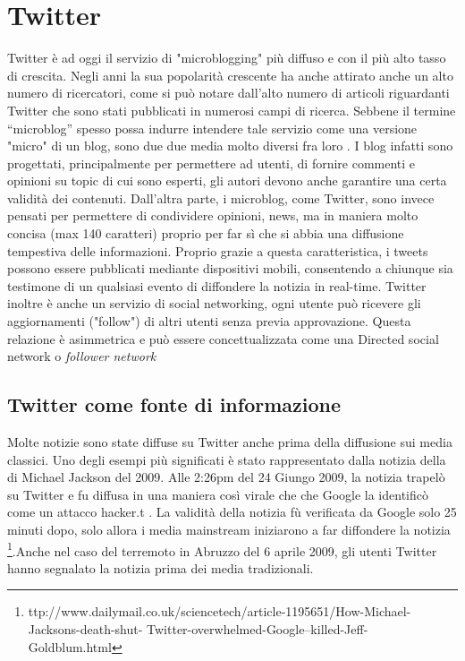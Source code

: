 \section*{Twitter}
Twitter è ad oggi il servizio di "microblogging" più diffuso e con il più alto tasso di crescita.  Negli anni la sua popolarità crescente ha anche attirato anche un alto numero di ricercatori, come si può notare dall'alto numero di articoli riguardanti Twitter che sono stati pubblicati in numerosi campi di ricerca.
Sebbene il termine  “microblog” spesso possa indurre intendere tale servizio come una versione "micro" di un blog, sono due due media molto diversi fra loro \cite{export:69500}. I blog infatti sono progettati, principalmente per permettere ad utenti, di fornire commenti e opinioni su topic di cui sono esperti, gli autori devono anche garantire una certa validità dei contenuti. Dall'altra parte, i microblog, come Twitter, sono invece pensati per permettere di condividere opinioni, news, ma in maniera molto concisa (max 140 caratteri) proprio per far sì che si abbia una  diffusione tempestiva delle informazioni. Proprio grazie a questa caratteristica, i tweets possono essere pubblicati mediante dispositivi mobili, consentendo a chiunque sia testimone di un qualsiasi evento di diffondere la notizia in real-time. Twitter inoltre è anche un servizio di social networking, ogni utente può ricevere gli aggiornamenti ("follow")  di altri utenti senza previa approvazione. Questa relazione è asimmetrica e può essere concettualizzata come una Directed social network o \emph{follower network} 
\subsection*{Twitter come fonte di informazione}
Molte notizie sono state diffuse su Twitter anche prima della diffusione sui media classici. Uno degli esempi più significati è stato rappresentato dalla notizia della di Michael Jackson del 2009. Alle 2:26pm
del 24 Giungo 2009, la notizia trapelò su Twitter e fu diffusa in una maniera così virale che che Google la identificò come un attacco hacker.t . La validità della notizia fù verificata da Google solo 25 minuti dopo,   solo allora i media mainstream iniziarono a far diffondere la notizia \footnote{ttp://www.dailymail.co.uk/sciencetech/article-1195651/How-Michael-Jacksons-death-shut-
Twitter-overwhelmed-Google–killed-Jeff-Goldblum.html}.Anche nel caso del terremoto in Abruzzo del 6 aprile 2009, gli utenti Twitter hanno segnalato la notizia prima dei media tradizionali. 
